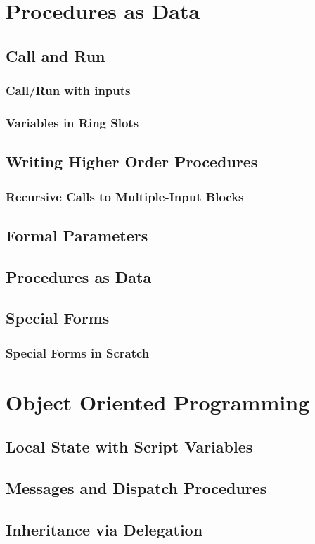 \documentclass{report}
\begin{document}
\chapter{Procedures as Data}
\section{Call and Run}
\subsection{Call/Run with inputs}
\subsection{Variables in Ring Slots}
\section{Writing Higher Order Procedures}
\subsection{Recursive Calls to Multiple-Input Blocks}
\section{Formal Parameters}
\section{Procedures as Data}
\section{Special Forms}
\subsection{Special Forms in Scratch}
\chapter{Object Oriented Programming}
\section{Local State with Script Variables}
\section{Messages and Dispatch Procedures}
\section{Inheritance via Delegation}
\end{document}
